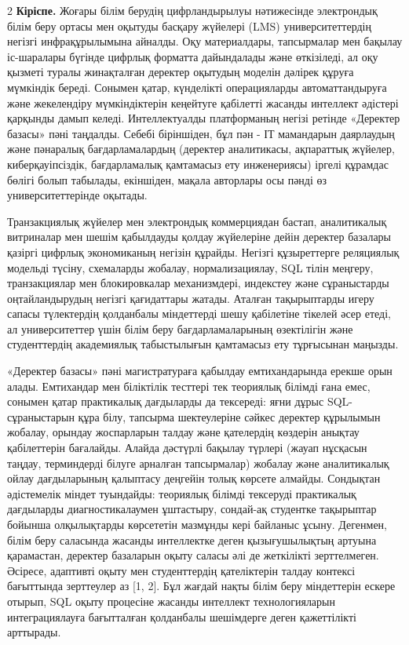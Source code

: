 \begin{multicols}{2}
{\bfseries Кіріспе.} Жоғары білім берудің цифрландырылуы нәтижесінде
электрондық білім беру ортасы мен оқытуды басқару жүйелері (LMS)
университеттердің негізгі инфрақұрылымына айналды. Оқу материалдары,
тапсырмалар мен бақылау іс-шаралары бүгінде цифрлық форматта дайындалады
және өткізіледі, ал оқу қызметі туралы жинақталған деректер оқытудың
моделін дәлірек құруға мүмкіндік береді. Сонымен қатар, күнделікті
операцияларды автоматтандыруға және жекелендіру мүмкіндіктерін кеңейтуге
қабілетті жасанды интеллект әдістері қарқынды дамып келеді.
Интеллектуалды платформаның негізі ретінде «Деректер базасы» пәні
таңдалды. Себебі біріншіден, бұл пән - ІТ мамандарын даярлаудың және
пәнаралық бағдарламалардың (деректер аналитикасы, ақпараттық жүйелер,
киберқауіпсіздік, бағдарламалық қамтамасыз ету инженериясы) іргелі
құрамдас бөлігі болып табылады, екіншіден, мақала авторлары осы пәнді өз
университеттерінде оқытады.

Транзакциялық жүйелер мен электрондық коммерциядан бастап, аналитикалық
витриналар мен шешім қабылдауды қолдау жүйелеріне дейін деректер
базалары қазіргі цифрлық экономиканың негізін құрайды. Негізгі
құзыреттерге реляциялық модельді түсіну, схемаларды жобалау,
нормализациялау, SQL тілін меңгеру, транзакциялар мен блокировкалар
механизмдері, индекстеу және сұраныстарды оңтайландырудың негізгі
қағидаттары жатады. Аталған тақырыптарды игеру сапасы түлектердің
қолданбалы міндеттерді шешу қабілетіне тікелей әсер етеді, ал
университеттер үшін білім беру бағдарламаларының өзектілігін және
студенттердің академиялық табыстылығын қамтамасыз ету тұрғысынан
маңызды.

«Деректер базасы» пәні магистратураға қабылдау емтихандарында ерекше
орын алады. Емтихандар мен біліктілік тесттері тек теориялық білімді
ғана емес, сонымен қатар практикалық дағдыларды да тексереді: яғни дұрыс
SQL-сұраныстарын құра білу, тапсырма шектеулеріне сәйкес деректер
құрылымын жобалау, орындау жоспарларын талдау және қателердің көздерін
анықтау қабілеттерін бағалайды. Алайда дәстүрлі бақылау түрлері (жауап
нұсқасын таңдау, терминдерді білуге арналған тапсырмалар) жобалау және
аналитикалық ойлау дағдыларының қалыптасу деңгейін толық көрсете
алмайды. Сондықтан әдістемелік міндет туындайды: теориялық білімді
тексеруді практикалық дағдыларды диагностикалаумен ұштастыру, сондай-ақ
студентке тақырыптар бойынша олқылықтарды көрсететін мазмұнды кері
байланыс ұсыну. Дегенмен, білім беру саласында жасанды интеллектке деген
қызығушылықтың артуына қарамастан, деректер базаларын оқыту саласы әлі
де жеткілікті зерттелмеген. Әсіресе, адаптивті оқыту мен студенттердің
қателіктерін талдау контексі бағыттында зерттеулер аз {[}1, 2{]}. Бұл
жағдай нақты білім беру міндеттерін ескере отырып, SQL оқыту процесіне
жасанды интеллект технологияларын интеграциялауға бағытталған қолданбалы
шешімдерге деген қажеттілікті арттырады.


\end{multicols}
